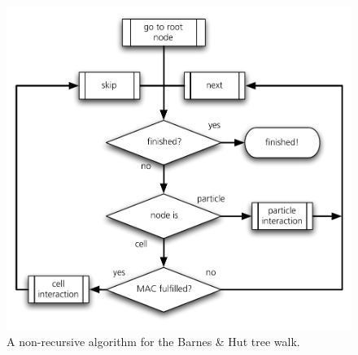 \begin{figure}[htbp]
\begin{center}
\includegraphics[scale=0.6]{19algo_gravwalk.pdf}
\caption{A non-recursive algorithm for the Barnes \& Hut tree walk.}
\label{ch02_grav02_fig09}
\end{center}
\end{figure}

